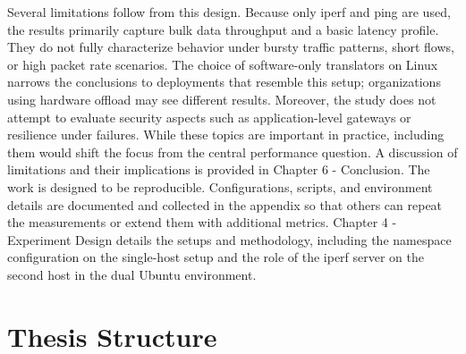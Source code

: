 Several limitations follow from this design. Because only iperf and ping are used, the results primarily capture bulk data throughput and a basic latency profile. They do not fully characterize behavior under bursty traffic patterns, short flows, or high packet rate scenarios. The choice of software-only translators on Linux narrows the conclusions to deployments that resemble this setup; organizations using hardware offload may see different results. Moreover, the study does not attempt to evaluate security aspects such as application-level gateways or resilience under failures. While these topics are important in practice, including them would shift the focus from the central performance question. A discussion of limitations and their implications is provided in Chapter 6 - Conclusion.
The work is designed to be reproducible. Configurations, scripts, and environment details are documented and collected in the appendix so that others can repeat the measurements or extend them with additional metrics. Chapter 4 - Experiment Design details the setups and methodology, including the namespace configuration on the single-host setup and the role of the iperf server on the second host in the dual Ubuntu environment.


\section{Thesis Structure}

